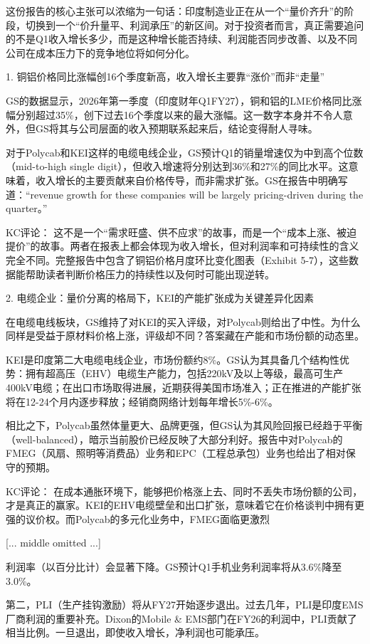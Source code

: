 \documentclass[11pt]{ctexart}
\begin{document}
这份报告的核心主张可以浓缩为一句话：印度制造业正在从一个“量价齐升”的阶段，切换到一个“价升量平、利润承压”的新区间。对于投资者而言，真正需要追问的不是Q1收入增长多少，而是这种增长能否持续、利润能否同步改善、以及不同公司在成本压力下的竞争地位将如何分化。

1. 铜铝价格同比涨幅创16个季度新高，收入增长主要靠“涨价”而非“走量”

GS的数据显示，2026年第一季度（印度财年Q1FY27），铜和铝的LME价格同比涨幅分别超过35\%，创下过去16个季度以来的最大涨幅。这一数字本身并不令人意外，但GS将其与公司层面的收入预期联系起来后，结论变得耐人寻味。

对于Polycab和KEI这样的电缆电线企业，GS预计Q1的销量增速仅为中到高个位数（mid-to-high single digit），但收入增速将分别达到36\%和27\%的同比水平。这意味着，收入增长的主要贡献来自价格传导，而非需求扩张。GS在报告中明确写道：“revenue growth for these companies will be largely pricing-driven during the quarter。”

KC评论： 这不是一个“需求旺盛、供不应求”的故事，而是一个“成本上涨、被迫提价”的故事。两者在报表上都会体现为收入增长，但对利润率和可持续性的含义完全不同。完整报告中包含了铜铝价格月度环比变化图表（Exhibit 5-7），这些数据能帮助读者判断价格压力的持续性以及何时可能出现逆转。

2. 电缆企业：量价分离的格局下，KEI的产能扩张成为关键差异化因素

在电缆电线板块，GS维持了对KEI的买入评级，对Polycab则给出了中性。为什么同样是受益于原材料价格上涨，评级却不同？答案藏在产能和市场份额的动态里。

KEI是印度第二大电缆电线企业，市场份额约8\%。GS认为其具备几个结构性优势：拥有超高压（EHV）电缆生产能力，包括220kV及以上等级，最高可生产400kV电缆；在出口市场取得进展，近期获得美国市场准入；正在推进的产能扩张将在12-24个月内逐步释放；经销商网络计划每年增长5\%-6\%。

相比之下，Polycab虽然体量更大、品牌更强，但GS认为其风险回报已经趋于平衡（well-balanced），暗示当前股价已经反映了大部分利好。报告中对Polycab的FMEG（风扇、照明等消费品）业务和EPC（工程总承包）业务也给出了相对保守的预期。

KC评论： 在成本通胀环境下，能够把价格涨上去、同时不丢失市场份额的公司，才是真正的赢家。KEI的EHV电缆壁垒和出口扩张，意味着它在价格谈判中拥有更强的议价权。而Polycab的多元化业务中，FMEG面临更激烈

[... middle omitted ...]

利润率（以百分比计）会显著下降。GS预计Q1手机业务利润率将从3.6\%降至3.0\%。

第二，PLI（生产挂钩激励）将从FY27开始逐步退出。过去几年，PLI是印度EMS厂商利润的重要补充。Dixon的Mobile \& EMS部门在FY26的利润中，PLI贡献了相当比例。一旦退出，即使收入增长，净利润也可能承压。
\end{document}
